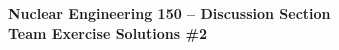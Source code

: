 \documentclass{report}
\begin{document}
\begin{center}
\textbf{\large Nuclear Engineering 150 -- Discussion Section}\\ 
\textbf{Team Exercise Solutions \#2}
\end{center}



\newpage



\newpage



\newpage



\end{document}

